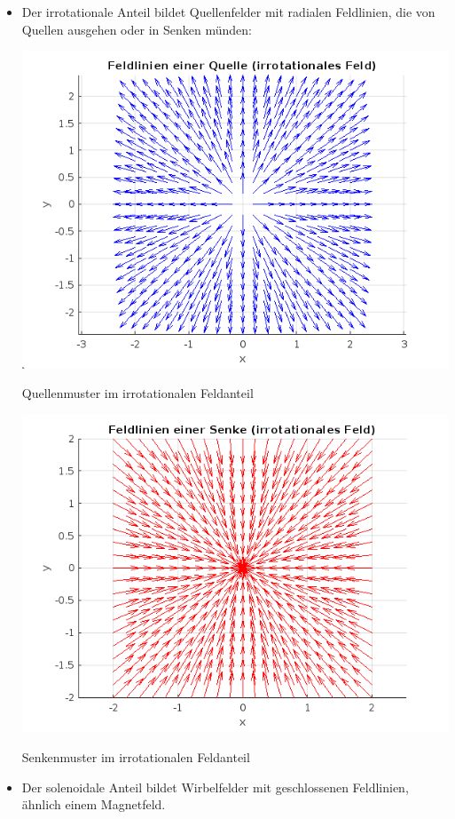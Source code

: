 \begin{itemize}
\item Der irrotationale Anteil bildet Quellenfelder mit radialen Feldlinien, die von Quellen ausgehen oder in Senken münden:
 
\begin{table}
\centering
\includegraphics[scale=0.3]{papers/helmholtz/images/Quelle.png}
\caption{Quellenmuster im irrotationalen Feldanteil}
\label{fig:quelle}
\end{table}
 
\begin{table}
\centering
\includegraphics[scale=0.3]{papers/helmholtz/images/Senke.png}
\caption{Senkenmuster im irrotationalen Feldanteil}
\label{fig:senke}
\end{table}
 
\item Der solenoidale Anteil bildet Wirbelfelder mit geschlossenen Feldlinien, ähnlich einem Magnetfeld.
\end{itemize}
  

